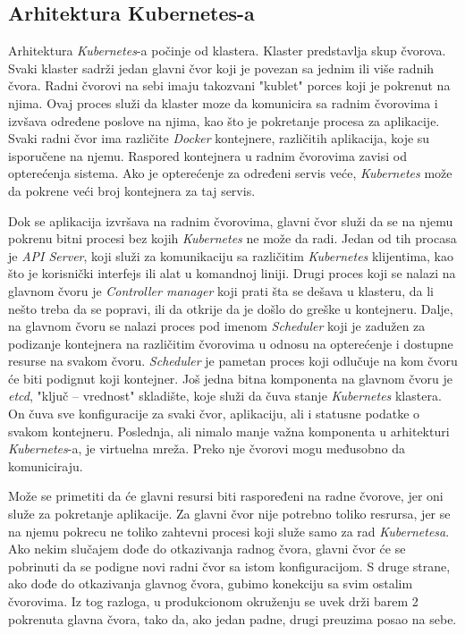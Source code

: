 \subsection{Arhitektura Kubernetes-a}
Arhitektura \textit{Kubernetes}-a počinje od klastera. Klaster predstavlja skup čvorova. Svaki klaster sadrži
jedan glavni čvor koji je povezan sa jednim ili više radnih čvora. Radni čvorovi na sebi imaju 
takozvani "kublet" porces koji je pokrenut na njima. Ovaj proces služi da klaster moze da komunicira
sa radnim čvorovima i izvšava određene poslove na njima, kao što je pokretanje procesa za aplikacije.
Svaki radni čvor ima različite \textit{Docker} kontejnere, različitih aplikacija, koje su isporučene na njemu.
Raspored kontejnera u radnim čvorovima zavisi od opterećenja sistema. Ako je opterećenje za određeni 
servis veće, \textit{Kubernetes} može da pokrene veći broj kontejnera za taj servis. 

Dok se aplikacija izvršava na radnim čvorovima, glavni čvor služi da se na njemu pokrenu bitni procesi 
bez kojih \textit{Kubernetes} ne može da radi. Jedan od tih procasa je {\em API Server}, koji služi za 
komunikaciju sa različitim \textit{Kubernetes} klijentima, kao što je korisnički interfejs ili alat u 
komandnoj liniji. Drugi proces koji se nalazi na glavnom čvoru je {\em Controller manager} koji 
prati šta se dešava u klasteru, da li nešto treba da se popravi, ili da otkrije da je došlo do greške 
u kontejneru. Dalje, na glavnom čvoru se nalazi proces pod imenom {\em Scheduler} koji je zadužen 
za podizanje kontejnera na različitim čvorovima u odnosu na opterećenje i dostupne resurse na svakom 
čvoru. \textit{Scheduler} je pametan proces koji odlučuje na kom čvoru će biti podignut koji kontejner. 
Još jedna bitna komponenta na glavnom čvoru je {\em etcd}, "ključ -- vrednost" skladište, koje služi 
da čuva stanje \textit{Kubernetes} klastera. On čuva sve konfiguracije za svaki čvor, aplikaciju, ali i statusne 
podatke o svakom kontejneru. Poslednja, ali nimalo manje važna komponenta u arhitekturi \textit{Kubernetes}-a, 
je virtuelna mreža. Preko nje čvorovi mogu međusobno da komuniciraju. 

Može se primetiti da će glavni resursi biti raspoređeni na radne čvorove, jer oni služe za pokretanje 
aplikacije. Za glavni čvor nije potrebno toliko resrursa, jer se na njemu pokrecu ne toliko zahtevni procesi 
koji služe samo za rad \textit{Kubernetesa}. Ako nekim slučajem dođe do otkazivanja radnog čvora, glavni čvor 
će se pobrinuti da se podigne novi radni čvor sa istom konfiguracijom. S druge strane, ako dođe do 
otkazivanja glavnog čvora, gubimo konekciju sa svim ostalim čvorovima. Iz tog razloga, u produkcionom 
okruženju se uvek drži barem 2 pokrenuta glavna čvora, tako da, ako jedan padne, drugi preuzima 
posao na sebe.

